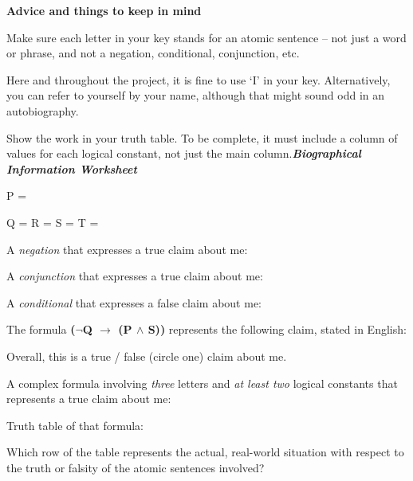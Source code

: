 \documentclass[oneside, openany]{book} %
\begin{document}
\noindent

\noindent

\noindent \textbf{Advice and things to keep in mind}

\noindent

\noindent

\noindent

\noindent Make sure each letter in your key stands for an atomic sentence -- not just a word or phrase, and not a negation, conditional, conjunction, etc.

\noindent Here and throughout the project, it is fine to use `I' in your key. Alternatively, you can refer to yourself by your name, although that might sound odd in an autobiography.

\noindent Show the work in your truth table. To be complete, it must include a column of values for each logical constant, not just the main column.\textbf{\textit{Biographical 
Information Worksheet}}

\noindent

\noindent {}

\noindent

\noindent P =

\noindent

\noindent Q = R = S = T =

\noindent A \textit{negation }that expresses a true claim about me: \underbar{ }

\noindent

\noindent A \textit{conjunction }that expresses a true claim about me: \underbar{ }

\noindent

\noindent A \textit{conditional }that expresses a false claim about me: \underbar{ }

\noindent

\noindent The formula \textbf{($\boldsymbol{\mathrm{\neg}}$Q $\boldsymbol{\mathrm{\to}}$ (P $\boldsymbol{\mathrm{\wedge}}$ S)) }represents the following claim, stated in English:


\noindent Overall, this is a true / false (circle one) claim about me.


\noindent A complex formula involving \textit{three }letters and \textit{at least two }logical constants that represents a true claim about me: \underbar{ }


\noindent Truth table of that formula:

\noindent Which row of the table represents the actual, real-world situation with respect to the truth or falsity of the atomic sentences involved?  \underbar{ }
\end{document}
